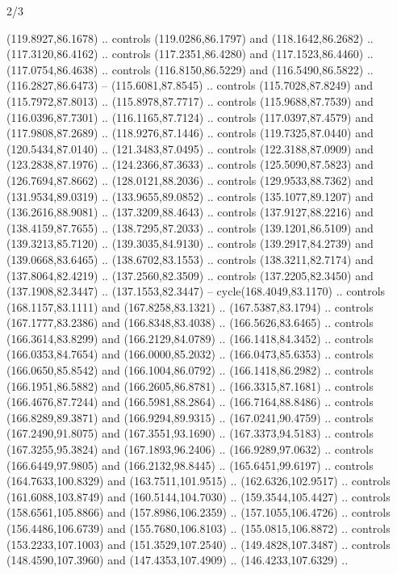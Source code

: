 \begin{flagdescription}{2/3}
\begin{scope}[shift={(0.5\flaglength,0.5)},scale=\flagwidth/320]
\begin{scope}[y=0.8pt, x=0.8pt, yscale=-1,shift={(-118.3,-146)}]
  (119.8927,86.1678) .. controls (119.0286,86.1797) and (118.1642,86.2682) ..
  (117.3120,86.4162) .. controls (117.2351,86.4280) and (117.1523,86.4460) ..
  (117.0754,86.4638) .. controls (116.8150,86.5229) and (116.5490,86.5822) ..
  (116.2827,86.6473) -- (115.6081,87.8545) .. controls (115.7028,87.8249) and
  (115.7972,87.8013) .. (115.8978,87.7717) .. controls (115.9688,87.7539) and
  (116.0396,87.7301) .. (116.1165,87.7124) .. controls (117.0397,87.4579) and
  (117.9808,87.2689) .. (118.9276,87.1446) .. controls (119.7325,87.0440) and
  (120.5434,87.0140) .. (121.3483,87.0495) .. controls (122.3188,87.0909) and
  (123.2838,87.1976) .. (124.2366,87.3633) .. controls (125.5090,87.5823) and
  (126.7694,87.8662) .. (128.0121,88.2036) .. controls (129.9533,88.7362) and
  (131.9534,89.0319) .. (133.9655,89.0852) .. controls (135.1077,89.1207) and
  (136.2616,88.9081) .. (137.3209,88.4643) .. controls (137.9127,88.2216) and
  (138.4159,87.7655) .. (138.7295,87.2033) .. controls (139.1201,86.5109) and
  (139.3213,85.7120) .. (139.3035,84.9130) .. controls (139.2917,84.2739) and
  (139.0668,83.6465) .. (138.6702,83.1553) .. controls (138.3211,82.7174) and
  (137.8064,82.4219) .. (137.2560,82.3509) .. controls (137.2205,82.3450) and
  (137.1908,82.3447) .. (137.1553,82.3447) -- cycle(168.4049,83.1170) ..
  controls (168.1157,83.1111) and (167.8258,83.1321) .. (167.5387,83.1794) ..
  controls (167.1777,83.2386) and (166.8348,83.4038) .. (166.5626,83.6465) ..
  controls (166.3614,83.8299) and (166.2129,84.0789) .. (166.1418,84.3452) ..
  controls (166.0353,84.7654) and (166.0000,85.2032) .. (166.0473,85.6353) ..
  controls (166.0650,85.8542) and (166.1004,86.0792) .. (166.1418,86.2982) ..
  controls (166.1951,86.5882) and (166.2605,86.8781) .. (166.3315,87.1681) ..
  controls (166.4676,87.7244) and (166.5981,88.2864) .. (166.7164,88.8486) ..
  controls (166.8289,89.3871) and (166.9294,89.9315) .. (167.0241,90.4759) ..
  controls (167.2490,91.8075) and (167.3551,93.1690) .. (167.3373,94.5183) ..
  controls (167.3255,95.3824) and (167.1893,96.2406) .. (166.9289,97.0632) ..
  controls (166.6449,97.9805) and (166.2132,98.8445) .. (165.6451,99.6197) ..
  controls (164.7633,100.8329) and (163.7511,101.9515) .. (162.6326,102.9517) ..
  controls (161.6088,103.8749) and (160.5144,104.7030) .. (159.3544,105.4427) ..
  controls (158.6561,105.8866) and (157.8986,106.2359) .. (157.1055,106.4726) ..
  controls (156.4486,106.6739) and (155.7680,106.8103) .. (155.0815,106.8872) ..
  controls (153.2233,107.1003) and (151.3529,107.2540) .. (149.4828,107.3487) ..
  controls (148.4590,107.3960) and (147.4353,107.4909) .. (146.4233,107.6329) ..

\end{scope}
\end{scope}
\end{flagdescription}
